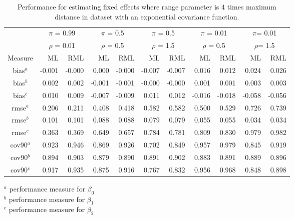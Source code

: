 \documentclass[12pt, titlepage]{article}
\begin{document}
\begin{table}[h]
				\caption{Performance for estimating fixed effects where range parameter is 4 times maximum distance in dataset with an exponential covariance function.}
\begin{center}
\begin{tabular}{c|rr|rr|rr|rr|rr}
  \hline
  \hline
  & \multicolumn{2}{|c|}{$\pi$ = 0.99} & \multicolumn{2}{|c|}{$\pi$ = 0.5}  
  & \multicolumn{2}{|c|}{$\pi$ = 0.5} & \multicolumn{2}{|c}{$\pi$ = 0.01} 
  & \multicolumn{2}{|c}{$\pi$= 0.01} \\
  & \multicolumn{2}{|c|}{$\rho$ = 0.01} & \multicolumn{2}{|c|}{$\rho$ = 0.5}  
  & \multicolumn{2}{|c|}{$\rho$ = 1.5} & \multicolumn{2}{|c}{$\rho$ = 0.5} 
  & \multicolumn{2}{|c}{$\rho$= 1.5} \\
  Measure & ML & RML & ML & RML & ML & RML & ML & RML & ML & RML \\
	\hline
  \hline
	bias$^a$ & -0.001 & -0.000 & 0.000 & -0.000 & -0.007 & -0.007 & 0.016 & 0.012 & 0.024 & 0.026 \\ 
  bias$^b$ & 0.002 & 0.002 & -0.001 & -0.001 & -0.000 & -0.000 & 0.001 & 0.001 & 0.003 & 0.003 \\ 
  bias$^c$ & 0.010 & 0.009 & -0.007 & -0.009 & 0.011 & 0.012 & -0.016 & -0.018 & -0.058 & -0.056 \\ 
  rmse$^a$ & 0.206 & 0.211 & 0.408 & 0.418 & 0.582 & 0.582 & 0.500 & 0.529 & 0.726 & 0.739 \\ 
  rmse$^b$ & 0.101 & 0.101 & 0.088 & 0.088 & 0.079 & 0.079 & 0.055 & 0.055 & 0.034 & 0.034 \\ 
  rmse$^c$ & 0.363 & 0.369 & 0.649 & 0.657 & 0.784 & 0.781 & 0.809 & 0.830 & 0.979 & 0.982 \\ 
  cov90$^a$ & 0.923 & 0.946 & 0.869 & 0.926 & 0.702 & 0.849 & 0.957 & 0.979 & 0.845 & 0.919 \\ 
  cov90$^b$ & 0.894 & 0.903 & 0.879 & 0.890 & 0.891 & 0.902 & 0.883 & 0.891 & 0.889 & 0.896 \\ 
  cov90$^c$ & 0.917 & 0.935 & 0.875 & 0.916 & 0.767 & 0.832 & 0.956 & 0.968 & 0.848 & 0.898 \\ 
  \hline
	\hline
\end{tabular}
\end{center}
$^a$ performance measure for $\beta_0$ \\
$^b$ performance measure for $\beta_1$ \\
$^c$ performance measure for $\beta_2$ \\
\end{table}
\end{document}
